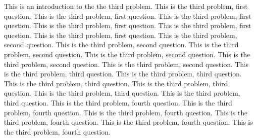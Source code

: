 \documentclass{cisXXX} %
\begin{document}
\HWproblem
This is an introduction to the the third problem.
\HWsubproblem
This is the third problem, first question.
This is the third problem, first question.
This is the third problem, first question.
This is the third problem, first question.
This is the third problem, first question.
This is the third problem, first question.
\HWsubproblem
This is the third problem, second question.
This is the third problem, second question.
This is the third problem, second question.
This is the third problem, second question.
This is the third problem, second question.
This is the third problem, second question.
\HWsubproblem
This is the third problem, third question.
This is the third problem, third question.
This is the third problem, third question.
This is the third problem, third question.
This is the third problem, third question.
This is the third problem, third question.
\HWsubproblem
This is the third problem, fourth question.
This is the third problem, fourth question.
This is the third problem, fourth question.
This is the third problem, fourth question.
This is the third problem, fourth question.
This is the third problem, fourth question.
\end{document}
